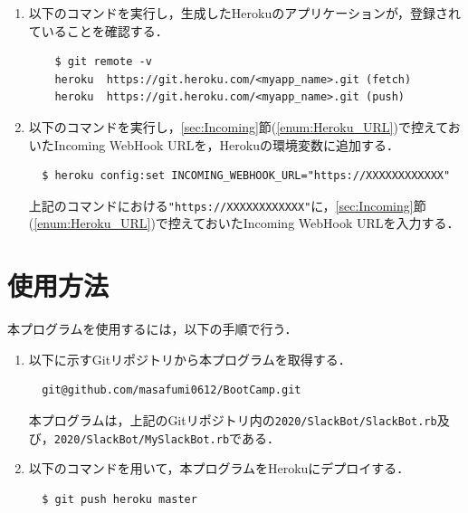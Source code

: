 \documentclass[12pt]{jsarticle}
\begin{document}
\begin{enumerate}
\item 以下のコマンドを実行し，生成したHerokuのアプリケーションが，登録されていることを確認する．
\begin{verbatim}
    $ git remote -v
    heroku	https://git.heroku.com/<myapp_name>.git (fetch)
    heroku	https://git.heroku.com/<myapp_name>.git (push)
\end{verbatim}
\item\label{enum:in_URL} 以下のコマンドを実行し，\ref{sec:Incoming}節(\ref{enum:Heroku_URL})で控えておいたIncoming WebHook URLを，Herokuの環境変数に追加する．
\begin{verbatim}
  $ heroku config:set INCOMING_WEBHOOK_URL="https://XXXXXXXXXXXX"
\end{verbatim}
上記のコマンドにおける\verb|"https://XXXXXXXXXXXX"|に，\ref{sec:Incoming}節(\ref{enum:Heroku_URL})で控えておいたIncoming WebHook URLを入力する．
\end{enumerate}

\section{使用方法}
本プログラムを使用するには，以下の手順で行う．
\begin{enumerate}
\item 以下に示すGitリポジトリから本プログラムを取得する．
\begin{verbatim}
  git@github.com/masafumi0612/BootCamp.git
\end{verbatim}
本プログラムは，上記のGitリポジトリ内の\verb|2020/SlackBot/SlackBot.rb|及び，\verb|2020/SlackBot/MySlackBot.rb|である．

\item 以下のコマンドを用いて，本プログラムをHerokuにデプロイする．
\begin{verbatim}
  $ git push heroku master
\end{verbatim}
\end{enumerate}
\end{document}
